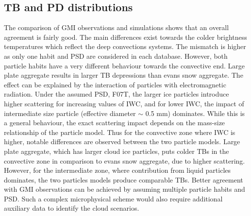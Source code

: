 \documentclass[amt, manuscript]{copernicus}
\begin{document}
\subsection{TB and PD distributions}

The comparison of GMI observations and simulations shows that an overall agreement is fairly good. The main differences exist towards the colder brightness temperatures which reflect the deep convections systems. The mismatch is higher as only one habit and PSD are considered in each database. However, both particle habits have a very different behaviour towards the convective end. Large plate aggregate results in larger TB depressions than evans snow aggregate. The effect can be explained by the interaction of particles with electromagnetic radiation. Under the assumed PSD, F07T, the larger ice particles introduce higher scattering for increasing values of IWC, and for lower IWC, the impact of intermediate size particle (effective diameter $\sim$ 0.5\,\,mm) dominates. While this is a general behaviour, the exact scattering impact depends on the mass-size relationship of the particle model. Thus for the convective zone where IWC is higher, notable differences are observed between the two particle models. Large plate aggregate, which has larger cloud ice particles, puts colder TBs in the convective zone in comparison to evans snow aggregate, due to higher scattering. However, for the intermediate zone, where contribution from liquid particles dominates, the two particles models produce comparable TBs. Better agreement with GMI observations can be achieved by assuming multiple particle habits and PSD. Such a complex microphysical scheme would also require additional auxiliary data to identify the cloud scenarios.  
\end{document}
